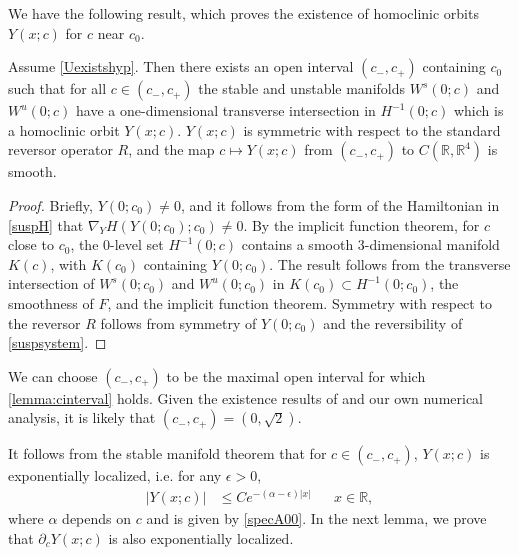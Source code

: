 \documentclass[review,onefignum,onetabnum]{siamart171218}
\newcommand{\R}{\mathbb{R}}
\begin{document}
We have the following result, which proves the existence of homoclinic orbits $Y(x; c)$ for $c$ near $c_0$.

\begin{lemma}\label{lemma:cinterval}
Assume \cref{Uexistshyp}. Then there exists an open interval $(c_-, c_+)$ containing $c_0$ such that for all $c \in (c_-, c_+)$ the stable and unstable manifolds $W^s(0; c)$ and $W^u(0; c)$ have a one-dimensional transverse intersection in $H^{-1}(0; c)$ which is a homoclinic orbit $Y(x; c)$. $Y(x; c)$ is symmetric with respect to the standard reversor operator $R$, and the map $c \mapsto Y(x; c)$ from $(c_-, c_+)$ to $C(\R, \R^4)$ is smooth.
\end{lemma}
\begin{proof}
Briefly, $Y(0; c_0) \neq 0$, and it follows from the form of the Hamiltonian in \cref{suspH} that $\nabla_Y H(Y(0; c_0); c_0) \neq 0$. By the implicit function theorem, for $c$ close to $c_0$, the 0-level set $H^{-1}(0; c)$ contains a smooth 3-dimensional manifold $K(c)$, with $K(c_0)$ containing $Y(0; c_0)$. The result follows from the transverse intersection of $W^s(0; c_0)$ and $W^u(0; c_0)$ in $K(c_0) \subset H^{-1}(0; c_0)$, the smoothness of $F$, and the implicit function theorem. Symmetry with respect to the reversor $R$ follows from symmetry of $Y(0; c_0)$ and the reversibility of \cref{suspsystem}.
\end{proof}

\begin{remark}We can choose $(c_-, c_+)$ to be the maximal open interval for which \cref{lemma:cinterval} holds. Given the existence results of \cite{Smets2002,Berg2018} and our own numerical analysis, it is likely that $(c_-, c_+) = (0, \sqrt{2})$. 
\end{remark}

It follows from the stable manifold theorem that for $c \in (c_-, c_+)$, $Y(x; c)$ is exponentially localized, i.e. for any $\epsilon > 0$, 
\begin{align}\label{Yexploc}
|Y(x; c)| &\leq C e^{-(\alpha - \epsilon)|x|} && x \in \R,
\end{align}
where $\alpha$ depends on $c$ and is given by \cref{specA00}. In the next lemma, we prove that $\partial_c Y(x; c)$ is also exponentially localized.
\end{document}
